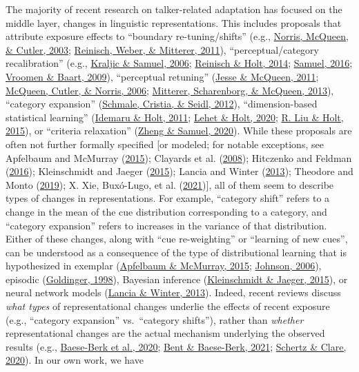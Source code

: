 \documentclass[
  11pt,
  man,floatsintext]{apa6}
\begin{document}
The majority of recent research on talker-related adaptation has focused on the middle layer, changes in linguistic representations. This includes proposals that attribute exposure effects to ``boundary re-tuning/shifts'' (e.g., \protect\hyperlink{ref-norris2003}{Norris, McQueen, \& Cutler, 2003}; \protect\hyperlink{ref-reinisch2011}{Reinisch, Weber, \& Mitterer, 2011}), ``perceptual/category recalibration'' (e.g., \protect\hyperlink{ref-kraljic-samuel2006}{Kraljic \& Samuel, 2006}; \protect\hyperlink{ref-reinisch-holt2014}{Reinisch \& Holt, 2014}; \protect\hyperlink{ref-samuel2016}{Samuel, 2016}; \protect\hyperlink{ref-vroomen-baart2009}{Vroomen \& Baart, 2009}), ``perceptual retuning'' (\protect\hyperlink{ref-jesse-mcqueen2011}{Jesse \& McQueen, 2011}; \protect\hyperlink{ref-mcqueen2006}{McQueen, Cutler, \& Norris, 2006}; \protect\hyperlink{ref-mitterer2013}{Mitterer, Scharenborg, \& McQueen, 2013}), ``category expansion'' (\protect\hyperlink{ref-schmale2012}{Schmale, Cristia, \& Seidl, 2012}), ``dimension-based statistical learning'' (\protect\hyperlink{ref-idemaru-holt2011}{Idemaru \& Holt, 2011}; \protect\hyperlink{ref-lehet-holt2020}{Lehet \& Holt, 2020}; \protect\hyperlink{ref-liu-holt2015}{R. Liu \& Holt, 2015}), or ``criteria relaxation'' (\protect\hyperlink{ref-zheng-samuel2020}{Zheng \& Samuel, 2020}). While these proposals are often not further formally specified {[}or modeled; for notable exceptions, see Apfelbaum and McMurray (\protect\hyperlink{ref-apfelbaum-mcmurray2015}{2015}); Clayards et al. (\protect\hyperlink{ref-clayards2008}{2008}); Hitczenko and Feldman (\protect\hyperlink{ref-hitczenko-feldman2016}{2016}); Kleinschmidt and Jaeger (\protect\hyperlink{ref-kleinschmidt-jaeger2015}{2015}); Lancia and Winter (\protect\hyperlink{ref-lancia-winter2013}{2013}); Theodore and Monto (\protect\hyperlink{ref-theodore-monto2019}{2019}); X. Xie, Buxó-Lugo, et al. (\protect\hyperlink{ref-xie2021cognition}{2021}){]}, all of them seem to describe types of changes in representations. For example, ``category shift'' refers to a change in the mean of the cue distribution corresponding to a category, and ``category expansion'' refers to increases in the variance of that distribution. Either of these changes, along with ``cue re-weighting'' or ``learning of new cues'', can be understood as a consequence of the type of distributional learning that is hypothesized in exemplar (\protect\hyperlink{ref-apfelbaum-mcmurray2015}{Apfelbaum \& McMurray, 2015}; \protect\hyperlink{ref-johnson2006}{Johnson, 2006}), episodic (\protect\hyperlink{ref-goldinger1998}{Goldinger, 1998}), Bayesian inference (\protect\hyperlink{ref-kleinschmidt-jaeger2015}{Kleinschmidt \& Jaeger, 2015}), or neural network models (\protect\hyperlink{ref-lancia-winter2013}{Lancia \& Winter, 2013}). Indeed, recent reviews discuss \emph{what types} of representational changes underlie the effects of recent exposure (e.g., ``category expansion'' vs.~``category shifts''), rather than \emph{whether} representational changes are the actual mechanism underlying the observed results (e.g., \protect\hyperlink{ref-baeseberk2020}{Baese-Berk et al., 2020}; \protect\hyperlink{ref-bent-baeseberk2021}{Bent \& Baese-Berk, 2021}; \protect\hyperlink{ref-schertz-clare2020}{Schertz \& Clare, 2020}). In our own work, we have 
\end{document}
